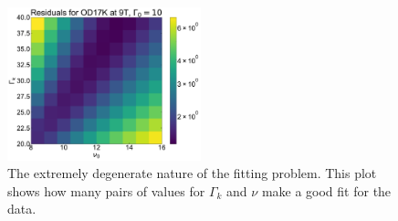 \begin{figure}
    \centering
    \includegraphics[width=0.5\textwidth]{figures/residuals_degenerate}
    \caption{The extremely degenerate nature of the fitting problem. This plot shows how many pairs
        of values for $\Gamma_k$ and $\nu$ make a good fit for the data.}
    \label{fig:residuals_degenerate}
\end{figure}
